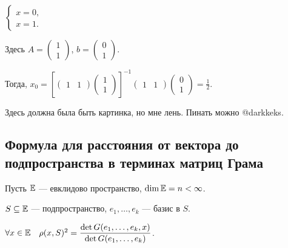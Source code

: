 \begin{example}
    \begin{math}
        \begin{cases}
            x = 0, \\
            x = 1.
        \end{cases}
    \end{math}

    Здесь $A = \begin{pmatrix} 1 \\ 1 \end{pmatrix}$, $b = \begin{pmatrix} 0 \\ 1 \end{pmatrix}$.

    Тогда, $x_0 = \left[\begin{pmatrix} 1 & 1 \end{pmatrix}\begin{pmatrix} 1 \\ 1 \end{pmatrix}\right]^{-1} \begin{pmatrix} 1 & 1 \end{pmatrix}\begin{pmatrix} 0 \\ 1 \end{pmatrix} = \frac{1}{2}$.
    
    \bigskip
    {\tiny Здесь должна была быть картинка, но мне лень. Пинать можно @darkkeks.}
\end{example}


\subsection{Формула для расстояния от вектора до подпространства в терминах матриц Грама}

Пусть $\mathbb{E}$ --- евклидово пространство, $\dim \mathbb{E} = n < \infty$.

$S \subseteq \mathbb{E}$ --- подпространство, $e_1, \dots, e_k$ --- базис в $S$.

\begin{theorem}
    $\forall x \in \mathbb{E} \quad \rho(x, S)^2 = \dfrac{\det G(e_1, \dots, e_k, x)}{\det G(e_1, \dots, e_k)}$.
\end{theorem}

